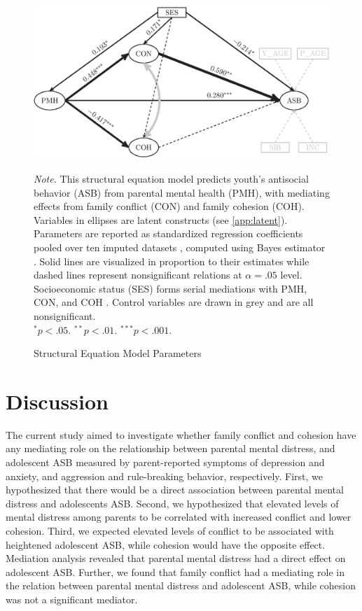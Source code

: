 \documentclass{sn-jnl}                  %
\begin{document}
\begin{figure}[t]
    \centering
    \includegraphics[width=\textwidth]{result.eps}
    \caption{Structural Equation Model Parameters}
    \label{fig:result}
    \begin{minipage}{\textwidth}
        \smallskip %
        \footnotesize %
        \textit{Note.} This structural equation model predicts youth's antisocial behavior (ASB) from parental mental health (PMH), with mediating effects from family conflict (CON) and family cohesion (COH). Variables in ellipses are latent constructs (see \cref{app:latent}). Parameters are reported as standardized regression coefficients pooled over ten imputed datasets \citep{little:2020,vanbuuren:2018}, computed using Bayes estimator \citep{depaoli:2021}. Solid lines are visualized in proportion to their estimates while dashed lines represent nonsignificant relations at $\alpha=.05$ level. Socioeconomic status (SES) forms serial mediations with PMH, CON, and COH \citep[Model 81,][p. 643]{hayes:2022}. Control variables are drawn in grey and are all nonsignificant.\\
        $^* p < .05$. $^{**} p < .01$. $^{***} p < .001$.
    \end{minipage}
\end{figure}

\section{Discussion}

The current study aimed to investigate whether family conflict and cohesion have any mediating role on the relationship between parental mental distress, and adolescent ASB measured by parent-reported symptoms of depression and anxiety, and aggression and rule-breaking behavior, respectively. First, we hypothesized that there would be a direct association between parental mental distress and adolescents ASB. Second, we hypothesized that elevated levels of mental distress among parents to be correlated with increased conflict and lower cohesion. Third, we expected elevated levels of conflict to be associated with heightened adolescent ASB, while cohesion would have the opposite effect. Mediation analysis revealed that parental mental distress had a direct effect on adolescent ASB. Further, we found that family conflict had a mediating role in the relation between parental mental distress and adolescent ASB, while cohesion was not a significant mediator.
\end{document}
